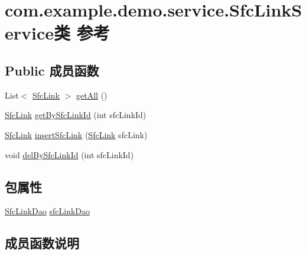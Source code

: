 \hypertarget{classcom_1_1example_1_1demo_1_1service_1_1_sfc_link_service}{}\section{com.\+example.\+demo.\+service.\+Sfc\+Link\+Service类 参考}
\label{classcom_1_1example_1_1demo_1_1service_1_1_sfc_link_service}
\subsection*{Public 成员函数}
\begin{DoxyCompactItemize}
\item 
List$<$ \mbox{\hyperlink{classcom_1_1example_1_1demo_1_1modular_1_1_sfc_link}{Sfc\+Link}} $>$ \mbox{\hyperlink{classcom_1_1example_1_1demo_1_1service_1_1_sfc_link_service_a4fa230d09b98cbc62a3736679d67c03e}{get\+All}} ()
\item 
\mbox{\hyperlink{classcom_1_1example_1_1demo_1_1modular_1_1_sfc_link}{Sfc\+Link}} \mbox{\hyperlink{classcom_1_1example_1_1demo_1_1service_1_1_sfc_link_service_a5f5a5a8c5409caaba67e1a40126d6737}{get\+By\+Sfc\+Link\+Id}} (int sfc\+Link\+Id)
\item 
\mbox{\hyperlink{classcom_1_1example_1_1demo_1_1modular_1_1_sfc_link}{Sfc\+Link}} \mbox{\hyperlink{classcom_1_1example_1_1demo_1_1service_1_1_sfc_link_service_ad1809ea28a713a4e14f0a21c85d7d63b}{insert\+Sfc\+Link}} (\mbox{\hyperlink{classcom_1_1example_1_1demo_1_1modular_1_1_sfc_link}{Sfc\+Link}} sfc\+Link)
\item 
void \mbox{\hyperlink{classcom_1_1example_1_1demo_1_1service_1_1_sfc_link_service_a4d3fa075595750fd61ef052c88c9070f}{del\+By\+Sfc\+Link\+Id}} (int sfc\+Link\+Id)
\end{DoxyCompactItemize}
\subsection*{包属性}
\begin{DoxyCompactItemize}
\item 
\mbox{\hyperlink{interfacecom_1_1example_1_1demo_1_1dao_1_1_sfc_link_dao}{Sfc\+Link\+Dao}} \mbox{\hyperlink{classcom_1_1example_1_1demo_1_1service_1_1_sfc_link_service_ad2ee07c8676377d9eca4022ed5f731a1}{sfc\+Link\+Dao}}
\end{DoxyCompactItemize}


\subsection{成员函数说明}
\mbox{\label{classcom_1_1example_1_1demo_1_1service_1_1_sfc_link_service_a4d3fa075595750fd61ef052c88c9070f}} 
